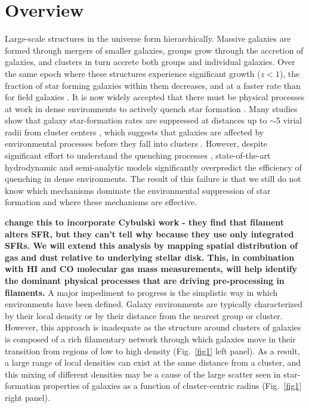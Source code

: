 \documentclass[11pt, preprint]{aastex}
\begin{document}
\section{Overview}
\vspace*{-.4cm}

Large-scale structures in the universe form hierarchically. Massive
galaxies are formed through mergers of smaller galaxies, groups grow
through the accretion of galaxies, and clusters in turn accrete both
groups and individual galaxies. Over the same epoch where these
structures experience significant growth ($z<1$), the fraction of star
forming galaxies within them decreases, and at a faster rate than for
field galaxies \citep{Saintonge08,Finn10}.  It is now widely accepted
that there must be physical processes at work in dense
environments to actively quench star formation
\citep[e.g.][]{Lewis02,Balogh04}.  Many studies show that galaxy star-formation rates are suppressed at distances up
to $\sim$5 virial radii from cluster centers \citep[see Fig.~\ref{fig1} right
panel; ][]{Lewis02,gomez03, bahe13}, which suggests that galaxies are
affected by environmental processes before they fall into clusters
\citep[e.g.][]{poggianti99,cortese06}.   However, despite 
significant effort to understand the quenching processes \citep[e.g.][]{Wetzel13},
state-of-the-art hydrodynamic \citep[e.g.][]{Dave11} and semi-analytic
\citep[e.g.][]{guo11a,Hirschmann14} models significantly overpredict
the efficiency of quenching in dense environments.  The result of this
failure is that we still do not know which mechanisms dominate the environmental
suppression of star formation and where these mechanisms are
effective.  

{\bf change this to incorporate Cybulski work - they find that
  filament alters SFR, but they can't tell why because they use only
  integrated SFRs.  We will extend this analysis by mapping spatial
  distribution of gas and dust relative to underlying stellar disk.
  This, in combination with HI and CO molecular gas mass measurements,
  will help identify the dominant physical processes that are driving
  pre-processing in filaments. }
A major impediment to progress is the simplistic way in which
environments have been defined.  Galaxy environments are typically
characterized by their local density or by their distance from the
nearest group or cluster.  However, this %
approach %
is inadequate as the structure around clusters of
galaxies is composed of a rich filamentary network through which
galaxies move in their transition from regions of low to high
density (Fig.~\ref{fig1} left panel).  As a result, a large range of local densities
can exist at the same distance from a cluster, 
and this mixing of different densities may be a cause of the large scatter seen in star-formation properties of galaxies as a function of cluster-centric radius (Fig.~\ref{fig1} right panel).
\end{document}

